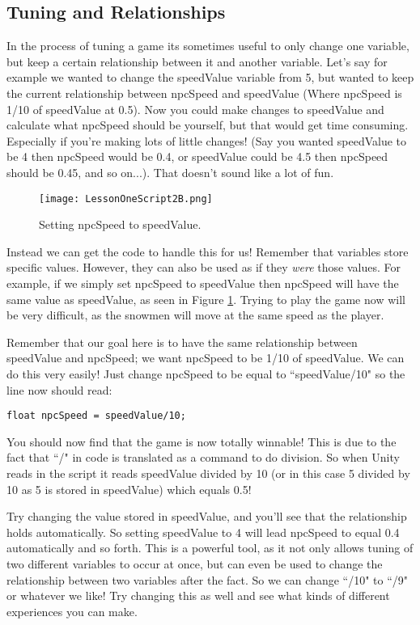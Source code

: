 \documentclass{article}
\begin{document}
\subsection{Tuning and Relationships}

In the process of tuning a game its sometimes useful to only change one variable, but keep a certain relationship between it and another variable. Let's say for example we wanted to change the speedValue variable from 5, but wanted to keep the current relationship between npcSpeed and speedValue (Where npcSpeed is 1/10 of speedValue at 0.5). Now you could make changes to speedValue and calculate what npcSpeed should be yourself, but that would get time consuming. Especially if you're making lots of little changes! (Say you wanted speedValue to be 4 then npcSpeed would be 0.4, or speedValue could be 4.5 then npcSpeed should be 0.45, and so on...). That doesn't sound like a lot of fun.

\begin{figure}
  \texttt{[image: LessonOneScript2B.png]}
  \caption{Setting npcSpeed to speedValue.}
  \label{fig:code2B}
\end{figure}

Instead we can get the code to handle this for us! Remember that variables store specific values. However, they can also be used as if they \textit{were} those values. For example, if we simply set npcSpeed to speedValue then npcSpeed will have the same value as speedValue, as seen in Figure \ref{fig:code2B}. Trying to play the game now will be very difficult, as the snowmen will move at the same speed as the player. 

Remember that our goal here is to have the same relationship between speedValue and npcSpeed; we want npcSpeed to be 1/10 of speedValue. We can do this very easily! Just change npcSpeed to be equal to ``speedValue/10" so the line now should read:

\lstset{style=sharpc}
\begin{lstlisting}
float npcSpeed = speedValue/10;
\end{lstlisting}
 
 You should now find that the game is now totally winnable! This is due to the fact that ``/" in code is translated as a command to do division. So when Unity reads in the script it reads speedValue divided by 10 (or in this case 5 divided by 10 as 5 is stored in speedValue) which equals 0.5!

Try changing the value stored in speedValue, and you'll see that the relationship holds automatically. So setting speedValue to 4 will lead npcSpeed to equal 0.4 automatically and so forth. This is a powerful tool, as it not only allows tuning of two different variables to occur at once, but can even be used to change the relationship between two variables after the fact. So we can change ``/10" to ``/9" or whatever we like! Try changing this as well and see what kinds of different experiences you can make. 
\end{document}
